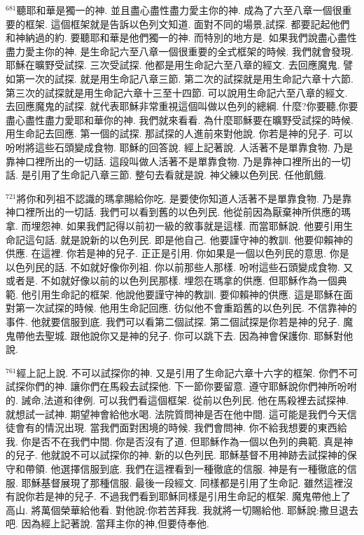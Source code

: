 \documentclass{book}
\begin{document}
$^{681}$聽耶和華是獨一的神.
並且盡心盡性盡力愛主你的神.
成為了六至八章一個很重要的框架.
這個框架就是告訴以色列文知道.
面對不同的場景,試探.
都要記起他們和神納過的約.
要聽耶和華是他們獨一的神.
而特別的地方是.
如果我們說盡心盡性盡力愛主你的神.
是生命記六至八章一個很重要的全式框架的時候.
我們就會發現.
耶穌在曠野受試探.
三次受試探.
他都是用生命記六至八章的經文.
去回應魔鬼.
譬如第一次的試探.
就是用生命記八章三節.
第二次的試探就是用生命記六章十六節.
第三次的試探就是用生命記六章十三至十四節.
可以說用生命記六至八章的經文.
去回應魔鬼的試探.
就代表耶穌非常重視這個叫做以色列的總綱.
什麼?你要聽,你要盡心盡性盡力愛耶和華你的神.
我們就來看看.
為什麼耶穌要在曠野受試探的時候.
用生命記去回應.
第一個的試探.
那試探的人進前來對他說.
你若是神的兒子.
可以吩咐將這些石頭變成食物.
耶穌的回答說.
經上記著說.
人活著不是單靠食物.
乃是靠神口裡所出的一切話.
這段叫做人活著不是單靠食物.
乃是靠神口裡所出的一切話.
是引用了生命記八章三節.
整句去看就是說.
神父練以色列民.
任他飢餓.

$^{721}$將你和列祖不認識的瑪拿賜給你吃.
是要使你知道人活著不是單靠食物.
乃是靠神口裡所出的一切話.
我們可以看到舊的以色列民.
他從前因為厭棄神所供應的瑪拿.
而埋怨神.
如果我們記得以前初一級的敘事就是這樣.
而當耶穌說.
他要引用生命記這句話.
就是說新的以色列民.
即是他自己.
他要謹守神的教訓.
他要仰賴神的供應.
在這裡.
你若是神的兒子.
正正是引用.
你如果是一個以色列民的意思.
你是以色列民的話.
不如就好像你列祖.
你以前那些人那樣.
吩咐這些石頭變成食物.
又或者是.
不如就好像以前的以色列民那樣.
埋怨在瑪拿的供應.
但耶穌作為一個典範.
他引用生命記的框架.
他說他要謹守神的教訓.
要仰賴神的供應.
這是耶穌在面對第一次試探的時候.
他用生命記回應.
彷似他不會重蹈舊的以色列民.
不信靠神的事件.
他就要信服到底.
我們可以看第二個試探.
第二個試探是你若是神的兒子.
魔鬼帶他去聖城.
跟他說你又是神的兒子.
你可以跳下去.
因為神會保護你.
耶穌對他說.

$^{761}$經上記上說.
不可以試探你的神.
又是引用了生命記六章十六字的框架.
你們不可試探你們的神.
讓你們在馬殺去試探他.
下一節你要留意.
遵守耶穌說你們神所吩咐的.
誡命,法道和律例.
可以我們看這個框架.
從前以色列民.
他在馬殺裡去試探神.
就想試一試神.
期望神會給他水喝.
法院質問神是否在他中間.
這可能是我們今天信徒會有的情況出現.
當我們面對困境的時候.
我們會問神.
你不給我想要的東西給我.
你是否不在我們中間.
你是否沒有了道.
但耶穌作為一個以色列的典範.
真是神的兒子.
他就說不可以試探你的神.
新的以色列民.
耶穌基督不用神跡去試探神的保守和帶領.
他選擇信服到底.
我們在這裡看到一種徹底的信服.
神是有一種徹底的信服.
耶穌基督展現了那種信服.
最後一段經文.
同樣都是引用了生命記.
雖然這裡沒有說你若是神的兒子.
不過我們看到耶穌同樣是引用生命記的框架.
魔鬼帶他上了高山.
將萬個榮華給他看.
對他說:你若苦拜我.
我就將一切賜給他.
耶穌說:撒旦退去吧.
因為經上記著說.
當拜主你的神,但要侍奉他.
\end{document}
